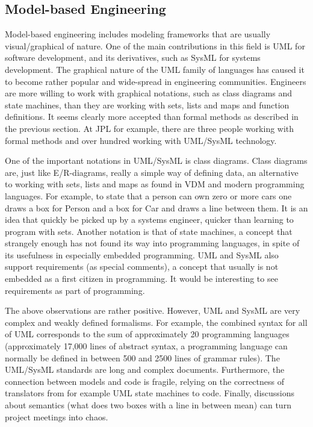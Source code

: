 \subsection{Model-based Engineering}

Model-based engineering includes modeling frameworks that are 
usually visual/graphical of nature. One of the main contributions 
in this field is UML for software development, and its derivatives, 
such as SysML for systems development. The graphical nature of the 
UML family of languages has caused it to become rather popular and 
wide-spread in engineering communities. Engineers are more willing 
to work with graphical notations, such as 
class diagrams and state machines, than they are working with sets, 
lists and maps and function definitions. It seems clearly more 
accepted than formal methods as described in the previous section. 
At JPL for example, there are three people working with formal 
methods and over hundred working with UML/SysML technology. 

One of the important notations in UML/SysML is class diagrams. 
Class diagrams are, just like E/R-diagrams, really a simple way 
of defining data, an alternative to working with sets, lists and 
maps as found in VDM and modern programming languages. For example, 
to state that a person can own zero or more cars one draws a box 
for Person and a box for Car and draws a line between them. It is 
an idea that quickly be picked up by a systems engineer, quicker 
than learning to program with sets. 
Another notation is that of state 
machines, a concept that strangely enough has not found its way 
into programming languages, in spite of its usefulness in 
especially embedded programming. UML and SysML also support 
requirements (as special comments), a concept that usually is not embedded as a first citizen in programming. 
It would be interesting to see requirements as part of programming.

The above observations are rather positive. However, UML and
SysML are very complex and weakly defined formalisms. 
For example, the combined syntax for all of UML corresponds 
to the sum of approximately 20 programming languages (approximately 
17,000 lines of abstract syntax, a programming language can 
normally be defined in between 500 and 2500 lines of grammar 
rules). The UML/SysML standards are long and complex documents. 
Furthermore, the connection between models and code is fragile, relying on the correctness of translators from for example UML state machines to code. Finally, discussions about semantics
(what does two boxes with a line in between mean) can turn 
project meetings into chaos.


